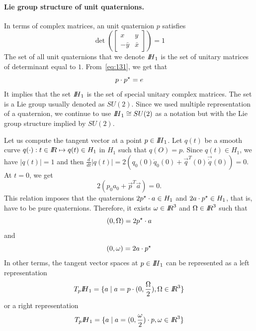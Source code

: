 \paragraph{Lie group structure of unit quaternions.} In terms of complex matrices, an unit quaternion $p$ satisfies
\begin{equation}
  \label{eq:125}
  \det\left(    \begin{bmatrix}
      x &y  \\
      - \bar y  & \bar x
    \end{bmatrix} \right) =1
\end{equation}
The set of all unit quaternions that we denote $\mbox{\rm $I\!\!H$}_1$ is the set of unitary matrices of determinant equal to $1$. From~\eqref{eq:131}, we get that
\begin{equation}
  \label{eq:126}
  p \cdot p^\star = e
\end{equation}
It implies that the set $\mbox{\rm $I\!\!H$}_1$ is the set of special unitary complex matrices. The set is a Lie group usually denoted as $SU(2)$. Since we used multiple representation of a quaternion, we continue to use $\mbox{\rm $I\!\!H$}_1 \cong SU(2)$ as a notation but with the Lie group structure implied by $SU(2)$.

Let us compute the tangent vector at a point $p \in \mbox{\rm $I\!\!H$}_1$. Let $q(t)$ be  a smooth curve $q(\cdot) : t\in \mbox{\rm $I\!\!R$} \mapsto q(t)\in H_1$ in $H_1$ such that $q(O)= p$.
Since $q(t)\in H_1$, we have $|q(t)|=1$ and then $\frac{d}{dt} |q(t)| = 2(q_0(0) \dot q_0(0) + \vec{q}^T(0) \vec{\dot q}(0) ) =0$. At $t=0$, we get
\begin{equation}
  \label{eq:48}
  2(p_0 a_0 + \vec{p}^T \vec{a})= 0.
\end{equation}
This relation imposes that the quaternions $2 p^\star \cdot a \in H_1$ and $2 a \cdot p^\star \in H_1$, that is, have to be pure quaternions. Therefore, it exists $\omega \in \mbox{\rm $I\!\!R$}^3$  and $\Omega \in \mbox{\rm $I\!\!R$}^3$ such that
\begin{equation}
  \label{eq:132}
  (0, \Omega) = 2 p ^\star \cdot a
\end{equation}
and
\begin{equation}
  \label{eq:132}
  (0, \omega) = 2 a\cdot p^\star
\end{equation}
In other terms, the tangent vector spaces at $p \in \mbox{\rm $I\!\!H$}_1$ can be represented as a left representation
\begin{equation}
  \label{eq:133}
  T_p\mbox{\rm $I\!\!H$}_1 = \{ a \mid a = p \cdot (0, \frac \Omega 2 ), \Omega \in \mbox{\rm $I\!\!R$}^3\}
\end{equation}
or a right representation
\begin{equation}
  \label{eq:1330}
  T_p{\mbox{\rm $I\!\!H$}_1} = \{ a \mid a =  (0, \frac \omega 2 ) \cdot p, \omega \in \mbox{\rm $I\!\!R$}^3\}
\end{equation}

